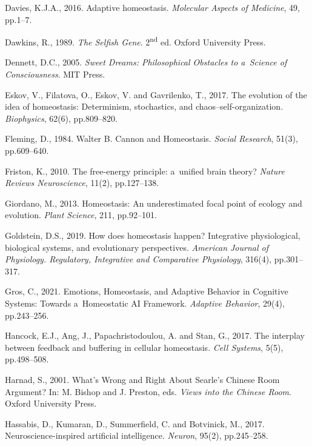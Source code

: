 Davies, K.J.A., 2016. Adaptive homeostasis. \textit{Molecular Aspects of Medicine}, 49, pp.1–7.



Dawkins, R., 1989. \textit{The Selfish Gene}. 2\textsuperscript{nd} ed. Oxford University Press.



Dennett, D.C., 2005. \textit{Sweet Dreams: Philosophical Obstacles to a~Science of Consciousness}. MIT Press.



Eskov, V., Filatova, O., Eskov, V. and Gavrilenko, T., 2017. The evolution of the idea of homeostasis: Determinism, stochastics, and chaos–self-organization. \textit{Biophysics}, 62(6), pp.809–820.



Fleming, D., 1984. Walter B. Cannon and Homeostasis. \textit{Social Research}, 51(3), pp.609–640.



Friston, K., 2010. The free-energy principle: a~unified brain theory? \textit{Nature Reviews Neuroscience}, 11(2), pp.127–138.



Giordano, M., 2013. Homeostasis: An underestimated focal point of ecology and evolution. \textit{Plant Science}, 211, pp.92–101.



Goldstein, D.S., 2019. How does homeostasis happen? Integrative physiological, biological systems, and evolutionary perspectives. \textit{American Journal of Physiology. Regulatory, Integrative and Comparative Physiology}, 316(4), pp.301–317.



Gros, C., 2021. Emotions, Homeostasis, and Adaptive Behavior in Cognitive Systems: Towards a~Homeostatic AI Framework. \textit{Adaptive Behavior}, 29(4), pp.243–256.



Hancock, E.J., Ang, J., Papachristodoulou, A. and Stan, G., 2017. The interplay between feedback and buffering in cellular homeostasis. \textit{Cell Systems}, 5(5), pp.498–508.



Harnad, S., 2001. What's Wrong and Right About Searle's Chinese Room Argument? In: M. Bishop and J. Preston, eds. \textit{Views into the Chinese Room}. Oxford University Press.



Hassabis, D., Kumaran, D., Summerfield, C. and Botvinick, M., 2017. Neuroscience-inspired artificial intelligence. \textit{Neuron}, 95(2), pp.245–258.




